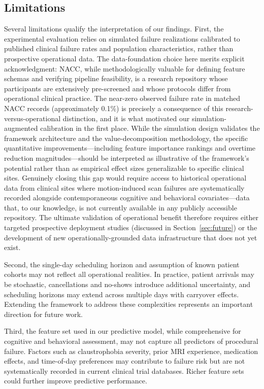 \documentclass[11pt,a4paper]{article}
\begin{document}
\subsection{Limitations}

Several limitations qualify the interpretation of our findings. First, the experimental evaluation relies on simulated failure realizations calibrated to published clinical failure rates and population characteristics, rather than prospective operational data. The data-foundation choice here merits explicit acknowledgment: NACC, while methodologically valuable for defining feature schemas and verifying pipeline feasibility, is a research repository whose participants are extensively pre-screened and whose protocols differ from operational clinical practice. The near-zero observed failure rate in matched NACC records (approximately 0.1\%) is precisely a consequence of this research-versus-operational distinction, and it is what motivated our simulation-augmented calibration in the first place. While the simulation design validates the framework architecture and the value-decomposition methodology, the specific quantitative improvements---including feature importance rankings and overtime reduction magnitudes---should be interpreted as illustrative of the framework's potential rather than as empirical effect sizes generalizable to specific clinical sites. Genuinely closing this gap would require access to historical operational data from clinical sites where motion-induced scan failures are systematically recorded alongside contemporaneous cognitive and behavioral covariates---data that, to our knowledge, is not currently available in any publicly accessible repository. The ultimate validation of operational benefit therefore requires either targeted prospective deployment studies (discussed in Section~\ref{sec:future}) or the development of new operationally-grounded data infrastructure that does not yet exist.

Second, the single-day scheduling horizon and assumption of known patient cohorts may not reflect all operational realities. In practice, patient arrivals may be stochastic, cancellations and no-shows introduce additional uncertainty, and scheduling horizons may extend across multiple days with carryover effects. Extending the framework to address these complexities represents an important direction for future work.

Third, the feature set used in our predictive model, while comprehensive for cognitive and behavioral assessment, may not capture all predictors of procedural failure. Factors such as claustrophobia severity, prior MRI experience, medication effects, and time-of-day preferences may contribute to failure risk but are not systematically recorded in current clinical trial databases. Richer feature sets could further improve predictive performance.
\end{document}
